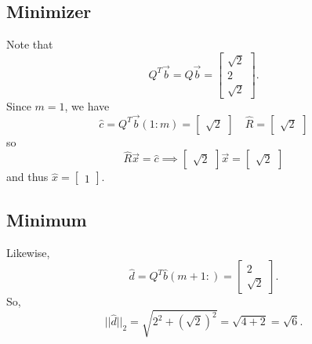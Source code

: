 \documentclass[letterpaper]{article}
\newcommand{\0}{\mathbf{0}}
\begin{document}
\subsection*{Minimizer}
Note that 
\[Q^T\vec{b} = Q\vec{b} = \begin{bmatrix}
    \sqrt{2} \\ 2 \\ \sqrt{2}
\end{bmatrix}.\] Since $m = 1$, we have 
\[\hat{c} = Q^T\vec{b}(1 : m) = \begin{bmatrix}
    \sqrt{2}
\end{bmatrix} \quad \hat{R} = \begin{bmatrix}
    \sqrt{2}
\end{bmatrix}\] so 
\[\hat{R}\vec{x} = \hat{c} \implies \begin{bmatrix}
    \sqrt{2}
\end{bmatrix} \vec{x} = \begin{bmatrix}
    \sqrt{2}
\end{bmatrix}\] and thus $\hat{x} = \begin{bmatrix}
    1
\end{bmatrix}$. 

\subsection*{Minimum}
Likewise, 
\[\hat{d} = Q^T\hat{b}(m+1:) = \begin{bmatrix}
    2 \\ \sqrt{2}
\end{bmatrix}.\] So, \[||\hat{d}||_2 = \sqrt{2^2 + (\sqrt{2})^2} = \sqrt{4 + 2} = \sqrt{6}.\]
\end{document}
